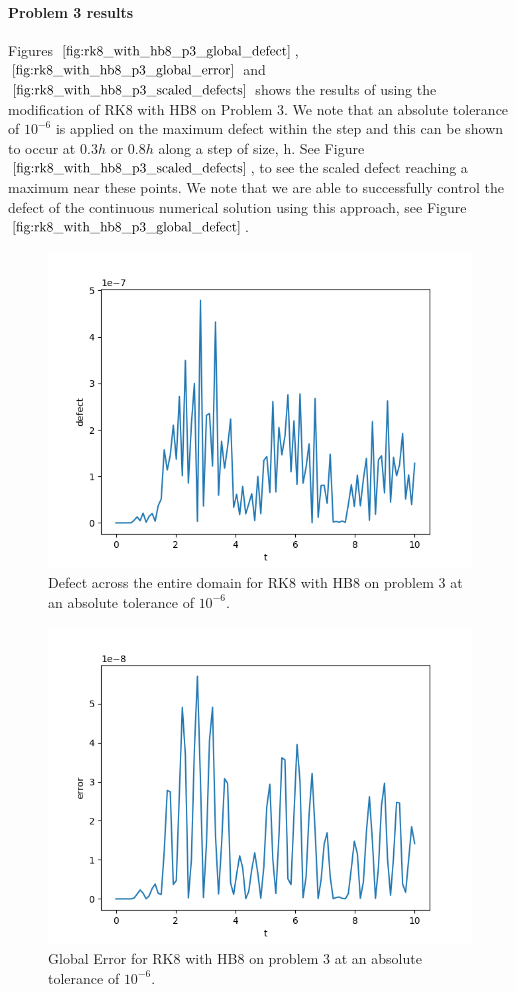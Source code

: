 \paragraph{Problem 3 results}
Figures $\ref{fig:rk8_with_hb8_p3_global_defect}$, $\ref{fig:rk8_with_hb8_p3_global_error}$ and $\ref{fig:rk8_with_hb8_p3_scaled_defects}$ shows the results of using the modification of RK8 with HB8 on Problem 3. 
We note that an absolute tolerance of $10^{-6}$ is applied on the maximum defect within the step and this can be shown to occur at $0.3h$ or $0.8h$ along a step of size, h. See Figure $\ref{fig:rk8_with_hb8_p3_scaled_defects}$, to see the scaled defect reaching a maximum near these points. We note that we are able to successfully control the defect of the continuous numerical solution using this approach, see Figure $\ref{fig:rk8_with_hb8_p3_global_defect}$. 


\begin{figure}[H]
\centering
\includegraphics[width=0.7\linewidth]{./figures/rk8_with_hb8_p3_global_defect}
\caption{Defect across the entire domain for RK8 with HB8 on problem 3 at an absolute tolerance of $10^{-6}$.}
\label{fig:rk8_with_hb8_p3_global_defect}
\end{figure}

\begin{figure}[H]
\centering
\includegraphics[width=0.7\linewidth]{./figures/rk8_with_hb8_p3_global_error}
\caption{Global Error for RK8 with HB8 on problem 3 at an absolute tolerance of $10^{-6}$.}
\label{fig:rk8_with_hb8_p3_global_error}
\end{figure}

